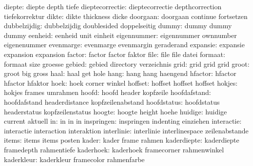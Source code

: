              diepte:  diepte               depth               tiefe
    dieptecorrectie:  dieptecorrectie      depthcorrection     tiefekorrektur
              dikte:  dikte                thickness           dicke
           doorgaan:  doorgaan             continue            fortsetzen
       dubbelzijdig:  dubbelzijdig         doublesided         doppelseitig
              dummy:  dummy                dummy               dummy
            eenheid:  eenheid              unit                einheit
        eigennummer:  eigennummer          ownnumber           eigenenummer
          evenmarge:  evenmarge            evenmargin          geraderand
           expansie:  expansie             expansion           expansion
             factor:  factor               factor              faktor
               file:  file                 file                datei
            formaat:  formaat              size                groesse
             gebied:  gebied               directory           verzeichnis
               grid:  grid                 grid                grid %
              groot:  groot                big                 gross
               haal:  haal                 get                 hole
               hang:  hang                 hang                haengend
            hfactor:  hfactor              hfactor             hfaktor
               hoek:  hoek                 corner              winkel
            hoffset:  hoffset              hoffset             hoffset
             hokjes:  hokjes               frames              umrahmen
              hoofd:  hoofd                header              kopfzeile
       hoofdafstand:  hoofdafstand         headerdistance      kopfzeilenabstand
        hoofdstatus:  hoofdstatus          headerstatus        kopfzeilenstatus
             hoogte:  hoogte               height              hoehe
            huidige:  huidige              current             aktuell
                 in:  in                   in                  in
         inspringen:  inspringen           indenting           einziehen
         interactie:  interactie           interaction         interaktion
         interlinie:  interlinie           interlinespace      zeilenabstande
              items:  items                items               posten
              kader:  kader                frame               rahmen
        kaderdiepte:  kaderdiepte          framedepth          rahmentiefe
          kaderhoek:  kaderhoek            framecorner         rahmenwinkel
         kaderkleur:  kaderkleur           framecolor          rahmenfarbe
